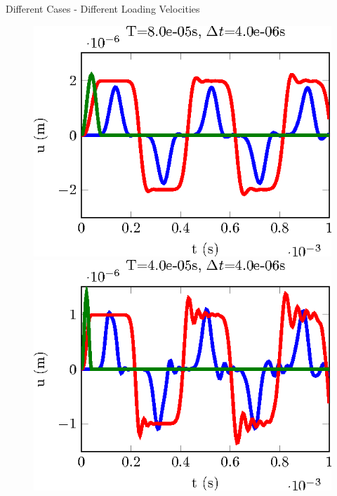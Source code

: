 \documentclass[10pt,a4paper]{beamer}
\begin{document}
\begin{frame}{Different Cases - Different Loading Velocities}
\begin{figure}
\begin{minipage}{0.24\linewidth}
			\includegraphics[width=1\linewidth]{CalculSchem3.T2.tikz.eps}
		\end{minipage}
		\begin{minipage}{0.24\linewidth}
			\includegraphics[width=1\linewidth]{CalculSchem3.T1.tikz.eps}
		\end{minipage}
	\end{figure}
	\vspace{-0.4cm}
	

\end{frame}
\end{document}
